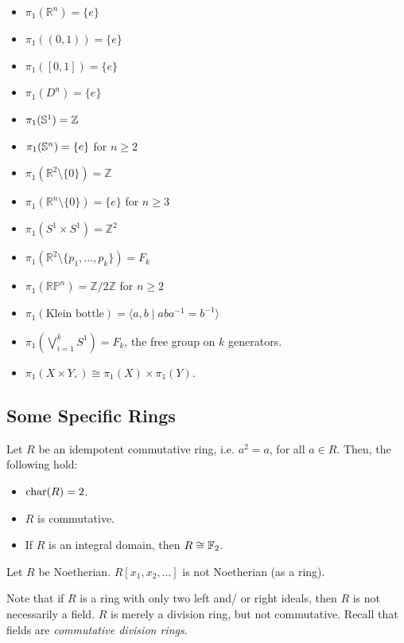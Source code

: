 \begin{itemize}
    \item $\pi_1(\mathbb{R}^n)=\{e\}$
    \item $\pi_1((0,1))=\{e\}$
    \item $\pi_1([0,1])=\{e\}$
    \item $\pi_1(D^n)=\{e\}$
    \item $\pi_1(\S^1)=\mathbb{Z}$
    \item $\pi_1(\S^n)=\{e\}$ for $n\geq2$
    \item $\pi_1(\mathbb{R}^2\setminus\{0\})=\mathbb{Z}$
    \item $\pi_1(\mathbb{R}^n\setminus\{0\})=\{e\}$ for $n\geq3$
    \item $\pi_1(S^1\times S^1)=\mathbb{Z}^2$
    \item $\pi_1(\mathbb{R}^2\setminus\{p_1,\ldots,p_k\})=F_k$
    \item $\pi_1(\mathbb{RP}^n)=\mathbb{Z}/2\mathbb{Z}$ for $n\geq2$
    \item $\pi_1(\text{Klein bottle})
    =\langle a,b\mid aba^{-1}=b^{-1}\rangle$
    \item $\pi_1\left(\bigvee_{i=1}^k S^1\right)=F_k$, the free group on $k$ generators.
    \item $\pi_1(X \times Y, ) \cong \pi_1(X) \times \pi_1(Y)$.
\end{itemize}

\subsection{Some Specific Rings}

\begin{proposition}
Let $R$ be an idempotent commutative ring, i.e. $a^2 = a$, for all $a \in R$.
Then, the following hold:
\begin{itemize}
    \item $\char(R) = 2$.
    \item $R$ is commutative.
    \item If $R$ is an integral domain, then $R \cong \F_2$.
\end{itemize}
\end{proposition}

\begin{example}
Let $R$ be Noetherian. $R[x_1, x_2, \dots]$ is not Noetherian (as a ring).
\end{example}

\begin{remark}
Note that if $R$ is a ring with only two left and/ or right ideals, 
then $R$ is not necessarily a field. $R$ is merely a division ring, but 
not commutative. Recall that fields are \emph{commutative division rings}.
\end{remark}

